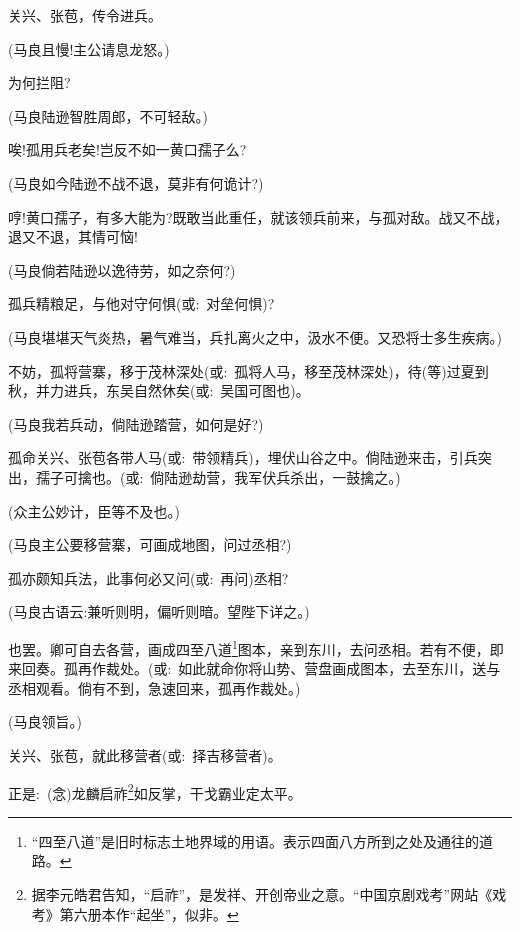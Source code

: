 {关兴、张苞，传令进兵。

(马良\hspace{30pt}且慢!主公请息龙怒。)

为何拦阻?

(马良\hspace{30pt}陆逊智胜周郎，不可轻敌。)

唉!孤用兵老矣!岂反不如一黄口孺子么?

(马良\hspace{30pt}如今陆逊不战不退，莫非有何诡计?)

哼!黄口孺子，有多大能为?既敢当此重任，就该领兵前来，与孤对敌。战又不战，退又不退，其情可恼!

(马良\hspace{30pt}倘若陆逊以逸待劳，如之奈何?)

孤兵精粮足，与他对守何惧({\akai 或}:~对垒何惧)?

(马良\hspace{30pt}堪堪天气炎热，暑气难当，兵扎离火之中，汲水不便。又恐将士多生疾病。)

不妨，孤将营寨，移于茂林深处({\akai 或}:~孤将人马，移至茂林深处)，待(等)过夏到秋，并力进兵，东吴自然休矣({\akai 或}:~吴国可图也)。

(马良\hspace{30pt}我若兵动，倘陆逊踏营，如何是好?)

孤命关兴、张苞各带人马({\akai 或}:~带领精兵)，埋伏山谷之中。倘陆逊来击，引兵突出，孺子可擒也。({\akai 或}:~倘陆逊劫营，我军伏兵杀出，一鼓擒之。)

(众\hspace{40pt}主公妙计，臣等不及也。)

(马良\hspace{30pt}主公要移营寨，可画成地图，问过丞相?)

孤亦颇知兵法，此事何必又问({\akai 或}:~再问)丞相?

(马良\hspace{30pt}古语云:兼听则明，偏听则暗。望陛下详之。)

也罢。卿可自去各营，画成四至八道\footnote{``四至八道''是旧时标志土地界域的用语。表示四面八方所到之处及通往的道路。}图本，亲到东川，去问丞相。若有不便，即来回奏。孤再作裁处。({\akai 或}:~如此就命你将山势、营盘画成图本，去至东川，送与丞相观看。倘有不到，急速回来，孤再作裁处。)

(马良\hspace{30pt}领旨。)

关兴、张苞，就此移营者({\akai 或}:~择吉移营者)。

正是:~({\akai 念})龙麟启祚\footnote{据李元皓{\scriptsize 君}告知，``启祚''，是发祥、开创帝业之意。``中国京剧戏考''网站《戏考》第六册本作``起坐''，似非。}如反掌，干戈霸业定太平。

}
